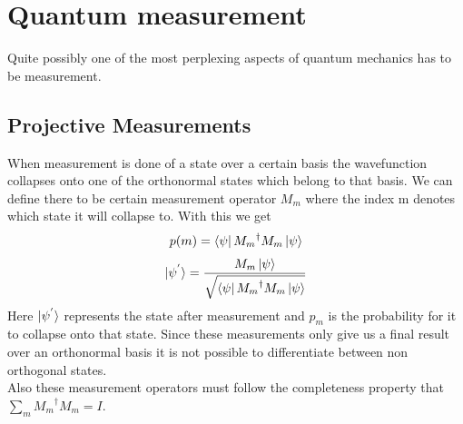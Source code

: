 \documentclass{report}
\begin{document}
\section{Quantum measurement}
Quite possibly one of the most perplexing aspects of quantum mechanics has to be measurement.
\subsection{Projective Measurements}
When measurement is done of a state over a certain basis the wavefunction collapses onto one of the orthonormal states which belong to that basis.
We can define there to be certain measurement operator $M_m$ where the index m denotes which state it will collapse to. With this we get\\
\begin{equation*}p(m) = \bra{\psi}{M_m}^{\dagger}M_m\ket{\psi}\end{equation*}
\begin{equation*}\ket{\psi^{'}} = \dfrac{M_m\ket{\psi}}{\sqrt{\bra{\psi}{M_m}^{\dagger}M_m\ket{\psi}}}\end{equation*}
Here $\ket{\psi^{'}}$ represents the state after measurement and $p_m$ is the probability for it to collapse onto that state.
Since these measurements only give us a final result over an orthonormal basis it is not possible to differentiate between non orthogonal states.\\
Also these measurement operators must follow the completeness property that $\sum_m{{M_m}^{\dagger}M_m} = I$.
\end{document}
